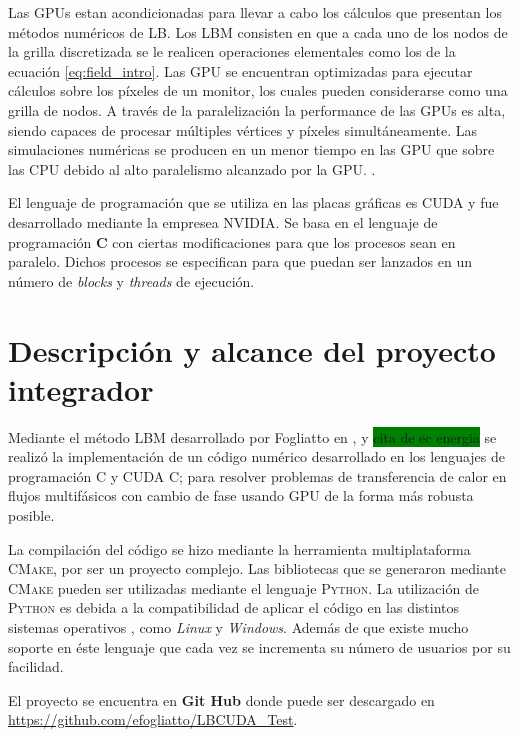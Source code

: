 Las GPUs estan acondicionadas para llevar a cabo los cálculos que presentan los métodos numéricos de LB. Los LBM consisten en que a cada uno de los nodos de la grilla discretizada se le realicen operaciones elementales como los de la ecuación \ref{eq:field_intro}. Las GPU se encuentran optimizadas para ejecutar cálculos sobre los píxeles de un monitor, los cuales pueden considerarse como una grilla de nodos. A través de la paralelización la performance de las GPUs es alta, siendo capaces de procesar múltiples vértices y píxeles simultáneamente. Las simulaciones numéricas se producen en un menor tiempo en las GPU que sobre las CPU debido al alto paralelismo alcanzado por la GPU. \cite{rinaldi2011modelos}.


El lenguaje de programación que se utiliza en las placas gráficas es CUDA y fue desarrollado mediante la empresea NVIDIA. Se basa en el lenguaje de programación \textbf{C} con ciertas modificaciones para que los procesos sean en paralelo. Dichos procesos se especifican para que puedan ser lanzados en un número de \textit{blocks} y \textit{threads} de ejecución.






\section{Descripción y alcance del proyecto integrador}

Mediante el método LBM desarrollado por Fogliatto en \cite{fogliatto2018modelado}, \cite{fogliatto2019simulation} y \colorbox{green}{cita de ec energia} se realizó la implementación de un código numérico desarrollado en los lenguajes de programación \textsc{C} y \textsc{CUDA C}; para resolver problemas de transferencia de calor en flujos multifásicos con cambio de fase usando GPU de la forma más robusta posible.

La compilación del código se hizo mediante la herramienta multiplataforma \textsc{CMake}, por ser un proyecto complejo. Las bibliotecas que se generaron mediante \textsc{CMake} pueden ser utilizadas mediante el lenguaje \textsc{Python}. La utilización de \textsc{Python} es debida a la compatibilidad de aplicar  el código en las distintos sistemas operativos , como \textit{Linux} y \textit{Windows}. Además de que existe mucho soporte en éste lenguaje que cada vez se incrementa su número de usuarios por su facilidad.

El proyecto se encuentra en \textbf{Git Hub} donde puede ser descargado en \url{ https://github.com/efogliatto/LBCUDA_Test}.


